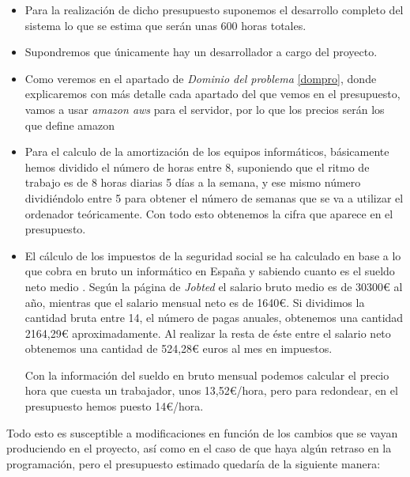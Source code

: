 \begin{itemize}
	\item Para la realización de dicho presupuesto suponemos el desarrollo completo del sistema lo que se estima que serán unas 600 horas totales.
	\item Supondremos que únicamente hay un desarrollador a cargo del proyecto.
	\item Como veremos en el apartado de \textit{Dominio del problema} \ref{dompro}, donde explicaremos con más detalle cada apartado del que vemos en el presupuesto, vamos a usar \textit{amazon aws} para el servidor, por lo que los precios serán los que define amazon \cite{aws}
	\item Para el calculo de la amortización de los equipos informáticos, básicamente hemos dividido el número de horas entre 8, suponiendo que el ritmo de trabajo es de 8 horas diarias 5 días a la semana, y ese mismo número dividiéndolo entre 5 para obtener el número de semanas que se va a utilizar el ordenador teóricamente. Con todo esto obtenemos la cifra que aparece en el presupuesto.
	\item El cálculo de los impuestos de la seguridad social se ha calculado en base a lo que cobra en bruto un informático en España y sabiendo cuanto es el sueldo neto medio \cite{jobted}. Según la página de \textit{Jobted} el salario bruto medio es de 30300€ al año, mientras que el salario mensual neto es de 1640€. Si dividimos la cantidad bruta entre 14, el número de pagas anuales, obtenemos una cantidad 2164,29€ aproximadamente. Al realizar la resta de éste entre el salario neto obtenemos una cantidad de 524,28€ euros al mes en impuestos. 
	
	Con la información del sueldo en bruto mensual podemos calcular el precio hora que cuesta un trabajador, unos 13,52€/hora, pero para redondear, en el presupuesto hemos puesto 14€/hora.
	
\end{itemize}

Todo esto es susceptible a modificaciones en función de los cambios que se vayan produciendo en el proyecto, así como en el caso de que haya algún retraso en la programación, pero el presupuesto estimado quedaría de la siguiente manera:

